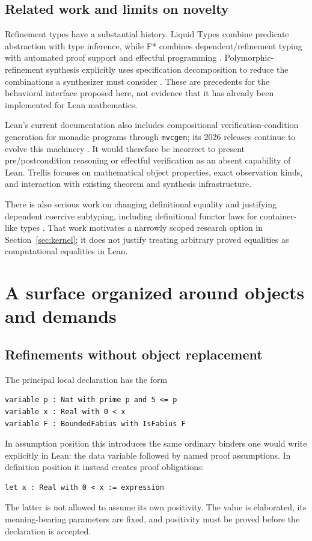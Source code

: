 \documentclass[11pt,a4paper]{article}
\theoremstyle{definition}
\theoremstyle{remark}
\newcommand{\code}[1]{\texttt{#1}}
\begin{document}
\subsection{Related work and limits on novelty}
Refinement types have a substantial history. Liquid Types combine predicate abstraction with type inference, while F* combines dependent/refinement typing with automated proof support and effectful programming \cite{liquid,fstar}. Polymorphic-refinement synthesis explicitly uses specification decomposition to reduce the combinations a synthesizer must consider \cite{synquid}. These are precedents for the behavioral interface proposed here, not evidence that it has already been implemented for Lean mathematics.

Lean's current documentation also includes compositional verification-condition generation for monadic programs through \code{mvcgen}; its 2026 releases continue to evolve this machinery \cite{leanTutorials,leanRelease}. It would therefore be incorrect to present pre/postcondition reasoning or effectful verification as an absent capability of Lean. Trellis focuses on mathematical object properties, exact observation kinds, and interaction with existing theorem and synthesis infrastructure.

There is also serious work on changing definitional equality and justifying dependent coercive subtyping, including definitional functor laws for container-like types \cite{functoriality}. That work motivates a narrowly scoped research option in Section~\ref{sec:kernel}; it does not justify treating arbitrary proved equalities as computational equalities in Lean.

\section{A surface organized around objects and demands}
\label{sec:surface}

\subsection{Refinements without object replacement}
The principal local declaration has the form
\begin{lstlisting}
variable p : Nat with prime p and 5 <= p
variable x : Real with 0 < x
variable F : BoundedFabius with IsFabius F
\end{lstlisting}
In assumption position this introduces the same ordinary binders one would write explicitly in Lean: the data variable followed by named proof assumptions. In definition position it instead creates proof obligations:
\begin{lstlisting}
let x : Real with 0 < x := expression
\end{lstlisting}
The latter is not allowed to assume its own positivity. The value is elaborated, its meaning-bearing parameters are fixed, and positivity must be proved before the declaration is accepted.
\end{document}
